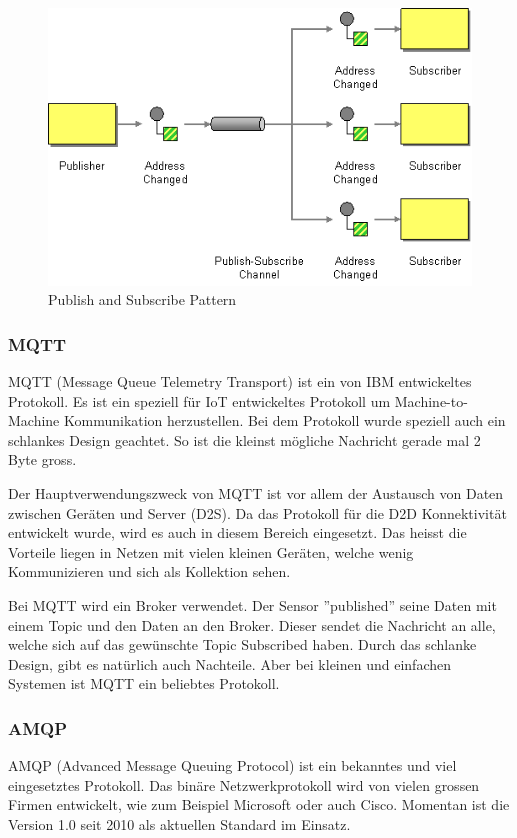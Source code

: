 \begin{figure}[H]
\centering
\includegraphics[scale=0.65]{images/publishsubscribe.png}
\caption{Publish and Subscribe Pattern\cite{PublishSubscribePattern}}
\end{figure}
\subsubsection{MQTT}
MQTT (Message Queue Telemetry Transport) ist ein von IBM entwickeltes Protokoll. Es ist ein speziell für IoT entwickeltes Protokoll um Machine-to-Machine Kommunikation herzustellen. Bei dem Protokoll wurde speziell auch ein schlankes Design geachtet. So ist die kleinst mögliche Nachricht gerade mal 2 Byte gross. 

Der Hauptverwendungszweck von MQTT ist vor allem der Austausch von Daten zwischen Geräten und Server (D2S).\cite{ProtPubSub} Da das Protokoll für die D2D Konnektivität entwickelt wurde, wird es auch in diesem Bereich eingesetzt. Das heisst die Vorteile liegen in Netzen mit vielen kleinen Geräten, welche wenig Kommunizieren und sich als Kollektion sehen.\cite{ProtPubSubReason}

Bei MQTT wird ein Broker verwendet. Der Sensor ''published'' seine Daten mit einem Topic und den Daten an den Broker. Dieser sendet die Nachricht an alle, welche sich auf das gewünschte Topic Subscribed haben. Durch das schlanke Design, gibt es natürlich auch Nachteile. Aber bei kleinen und einfachen Systemen ist MQTT ein beliebtes Protokoll.
\subsubsection{AMQP}
AMQP (Advanced Message Queuing Protocol) ist ein bekanntes und viel eingesetztes Protokoll. Das binäre Netzwerkprotokoll wird von vielen grossen Firmen\cite{ProtPubSubReason} entwickelt, wie zum Beispiel Microsoft oder auch Cisco. Momentan ist die Version 1.0 seit 2010 als aktuellen Standard im Einsatz.

